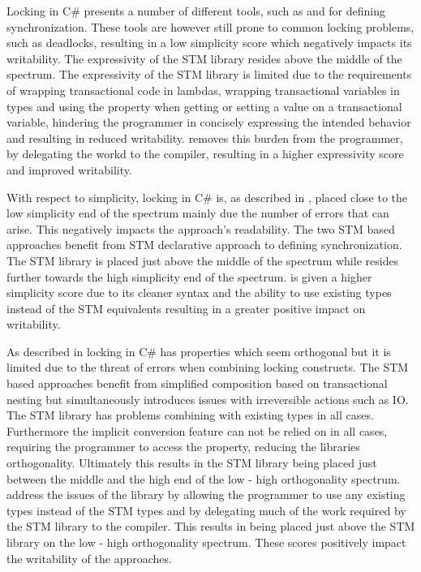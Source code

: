 Locking in C\# presents a number of different tools, such as  and  for defining synchronization. These tools are however still prone to common locking problems, such as deadlocks, resulting in a low simplicity score which negatively impacts its writability. The expressivity of the \ac{STM} library resides above the middle of the spectrum. The expressivity of the \ac{STM} library is limited due to the requirements of wrapping transactional code in lambdas, wrapping transactional variables in  types and using the  property when getting or setting a value on a transactional variable, hindering the programmer in concisely expressing the intended behavior and resulting in reduced writability. \stmname removes this burden from the programmer, by delegating the workd to the compiler, resulting in a higher expressivity score and improved writability.

With respect to simplicity, locking in C\# is, as described in , placed close to the low simplicity end of the spectrum mainly due the number of errors that can arise. This negatively impacts the approach's readability. The two \ac{STM} based approaches benefit from \ac{STM} declarative approach to defining synchronization. The \ac{STM} library is placed just above the middle of the spectrum while \stmname resides further towards the high simplicity end of the spectrum. \stmname is given a higher simplicity score due to its cleaner syntax and the ability to use existing types instead of the \ac{STM} equivalents resulting in a greater positive impact on writability.

As described in  locking in C\# has properties which seem orthogonal but it is limited due to the threat of errors when combining locking constructs. The \ac{STM} based approaches benefit from simplified composition based on transactional nesting but simultaneously introduces issues with irreversible actions such as \ac{IO}. The \ac{STM} library has problems combining with existing types in all cases. Furthermore the implicit conversion feature can not be relied on in all cases, requiring the programmer to access the  property, reducing the libraries orthogonality. Ultimately this results in the \ac{STM} library being placed just between the middle and the high end of the low - high orthogonality spectrum. \stmname address the issues of the  library by allowing the programmer to use any existing types instead of the \ac{STM} types and by delegating much of the work required by the \ac{STM} library to the compiler. This results in \stmname being placed just above the \ac{STM} library on the  low - high orthogonality spectrum. These scores positively impact the writability of the approaches.

